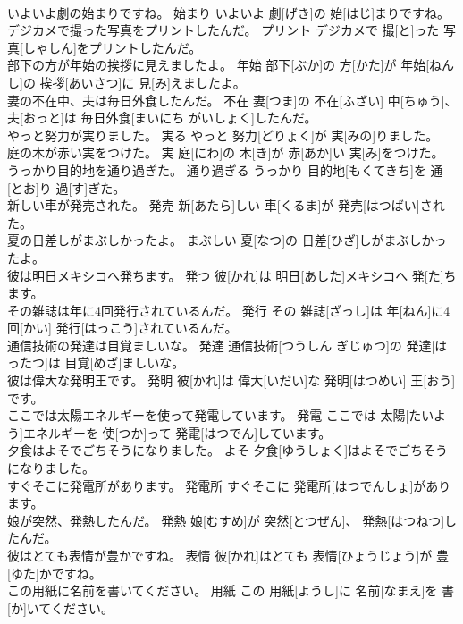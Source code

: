 \documentclass[8pt]{extreport}
\begin{document}
\begin{CJK}{UTF8}{min}
\\	いよいよ劇の始まりですね。	始まり	いよいよ 劇[げき]の 始[はじ]まりですね。	
\\	デジカメで撮った写真をプリントしたんだ。	プリント	デジカメで 撮[と]った 写真[しゃしん]をプリントしたんだ。	
\\	部下の方が年始の挨拶に見えましたよ。	年始	部下[ぶか]の 方[かた]が 年始[ねんし]の 挨拶[あいさつ]に 見[み]えましたよ。	
\\	妻の不在中、夫は毎日外食したんだ。	不在	妻[つま]の 不在[ふざい] 中[ちゅう]、 夫[おっと]は 毎日外食[まいにち がいしょく]したんだ。	
\\	やっと努力が実りました。	実る	やっと 努力[どりょく]が 実[みの]りました。	
\\	庭の木が赤い実をつけた。	実	庭[にわ]の 木[き]が 赤[あか]い 実[み]をつけた。	
\\	うっかり目的地を通り過ぎた。	通り過ぎる	うっかり 目的地[もくてきち]を 通[とお]り 過[す]ぎた。	
\\	新しい車が発売された。	発売	新[あたら]しい 車[くるま]が 発売[はつばい]された。	
\\	夏の日差しがまぶしかったよ。	まぶしい	夏[なつ]の 日差[ひざ]しがまぶしかったよ。	
\\	彼は明日メキシコへ発ちます。	発つ	彼[かれ]は 明日[あした]メキシコへ 発[た]ちます。	
\\	その雑誌は年に4回発行されているんだ。	発行	その 雑誌[ざっし]は 年[ねん]に4 回[かい] 発行[はっこう]されているんだ。	
\\	通信技術の発達は目覚ましいな。	発達	通信技術[つうしん ぎじゅつ]の 発達[はったつ]は 目覚[めざ]ましいな。	
\\	彼は偉大な発明王です。	発明	彼[かれ]は 偉大[いだい]な 発明[はつめい] 王[おう]です。	
\\	ここでは太陽エネルギーを使って発電しています。	発電	ここでは 太陽[たいよう]エネルギーを 使[つか]って 発電[はつでん]しています。	
\\	夕食はよそでごちそうになりました。	よそ	夕食[ゆうしょく]はよそでごちそうになりました。	
\\	すぐそこに発電所があります。	発電所	すぐそこに 発電所[はつでんしょ]があります。	
\\	娘が突然、発熱したんだ。	発熱	娘[むすめ]が 突然[とつぜん]、 発熱[はつねつ]したんだ。	
\\	彼はとても表情が豊かですね。	表情	彼[かれ]はとても 表情[ひょうじょう]が 豊[ゆた]かですね。	
\\	この用紙に名前を書いてください。	用紙	この 用紙[ようし]に 名前[なまえ]を 書[か]いてください。	

\end{CJK}
\end{document}
